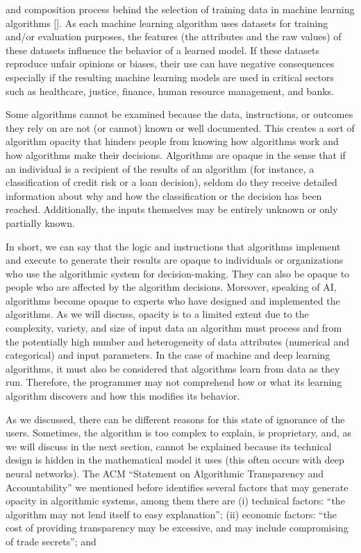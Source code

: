 {\noindent\baselineskip14.4pt and composition process behind the \hbox{selection} of training data in machine learning algorithms [\citealt{chap:10:Gebruetal:2021}]. As each machine learning algorithm uses datasets for training and/or evaluation purposes, the features (the attributes and the raw values) of these datasets influence the behavior of a learned model. If these datasets reproduce unfair opinions or biases, their use can have negative consequences especially if the resulting machine learning models are used in critical sectors such as healthcare, justice, finance, human resource management, and banks.

Some algorithms cannot be examined because the data, instructions, or outcomes they rely on are not (or cannot) known or well documented. This creates a sort of algorithm opacity that hinders people from knowing how algorithms work and how algorithms make their decisions. Algorithms are opaque in the sense that if an individual is a recipient of the results of an algorithm (for instance, a classification of credit risk or a loan decision), seldom do they receive detailed information about why and how the classification or the decision has been reached. Additionally, the inputs themselves may be entirely unknown or only partially known.

In short, we can say that the logic and instructions that algorithms implement and execute to generate their results are opaque to individuals or organizations who use the algorithmic system for decision-making. They can also be opaque to people who are affected by the algorithm decisions. Moreover, speaking of AI, algorithms become opaque to experts who have designed and implemented the algorithms. As we will discuss, opacity is to a limited extent due to the complexity, variety, and size of input data an algorithm must process and from the potentially high number and heterogeneity of data attributes (numerical and categorical) and input parameters. In the case of machine and deep learning algorithms, it must also be considered that algorithms learn from data as they run. Therefore, the programmer may not comprehend how or what its learning algorithm discovers and how this modifies its behavior.

As we discussed, there can be different reasons for this state of ignorance of the users. Sometimes, the algorithm is too complex to explain, is proprietary, and, as we will discuss in the next section, cannot be explained because its technical design is hidden in the mathematical model it uses (this often occurs with deep neural networks). The ACM ``Statement on Algorithmic Transparency and Accountability'' we mentioned before identifies several factors that may generate opacity in algorithmic systems, among them there are (i) technical factors: ``the algorithm may not lend itself to easy explanation''; (ii) economic factors: ``the cost of providing transparency may be excessive, and may include compromising of trade secrets''; and\vspace*{-14pt}\break\par}

